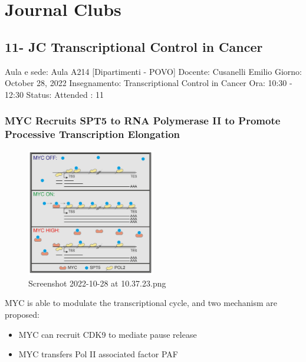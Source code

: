 \graphicspath{{chapters/_resources/}}

\chapter{Journal Clubs}

\section{11- JC Transcriptional Control in Cancer}

Aula e sede: Aula A214 {[}Dipartimenti - POVO{]} Docente: Cusanelli
Emilio Giorno: October 28, 2022 Insegnamento: Transcriptional Control in
Cancer Ora: 10:30 - 12:30 Status: Attended ﻿: 11

\hypertarget{myc-recruits-spt5-to-rna-polymerase-ii-to-promote-processive-transcription-elongation}{%
\subsection{MYC Recruits SPT5 to RNA Polymerase II to Promote Processive
Transcription
Elongation}\label{myc-recruits-spt5-to-rna-polymerase-ii-to-promote-processive-transcription-elongation}}

\begin{figure}
\centering
\includegraphics[width=0.5\textwidth]{../_resources/Screenshot_2022-10-28_at_10-37-23.png}
\caption{Screenshot 2022-10-28 at 10.37.23.png}
\end{figure}

MYC is able to modulate the transcriptional cycle, and two mechanism are
proposed:

\begin{itemize}
\tightlist
\item
  MYC can recruit CDK9 to mediate pause release
\item
  MYC transfers Pol II associated factor PAF
\end{itemize}

